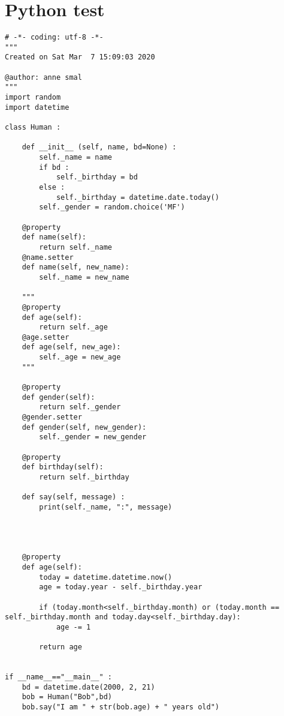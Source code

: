 \documentclass[a4paper, letterpaper]{report}
\begin{document}
\section{Python test}
\label{ss:python}

\begin{lstlisting}[style=Pythonstyle]
    # -*- coding: utf-8 -*-
"""
Created on Sat Mar  7 15:09:03 2020

@author: anne smal
"""
import random 
import datetime

class Human :
  
    def __init__ (self, name, bd=None) :
        self._name = name
        if bd :
            self._birthday = bd
        else :
            self._birthday = datetime.date.today()
        self._gender = random.choice('MF')

    @property
    def name(self):
        return self._name
    @name.setter
    def name(self, new_name):
        self._name = new_name
        
    """
    @property
    def age(self):
        return self._age
    @age.setter
    def age(self, new_age):
        self._age = new_age
    """
    
    @property
    def gender(self):
        return self._gender
    @gender.setter
    def gender(self, new_gender):
        self._gender = new_gender
        
    @property
    def birthday(self):
        return self._birthday
    
    def say(self, message) :
        print(self._name, ":", message)
        
        

    
    @property
    def age(self):
        today = datetime.datetime.now()
        age = today.year - self._birthday.year
        
        if (today.month<self._birthday.month) or (today.month == self._birthday.month and today.day<self._birthday.day):
            age -= 1
            
        return age    
        
        
if __name__=="__main__" :
    bd = datetime.date(2000, 2, 21)
    bob = Human("Bob",bd)    
    bob.say("I am " + str(bob.age) + " years old")
\end{lstlisting}
\end{document}
